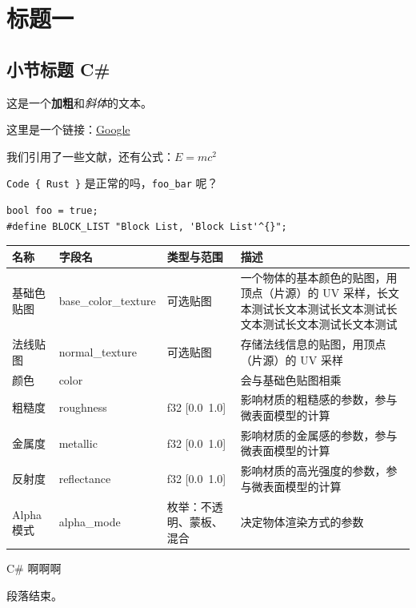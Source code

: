 \chapter*{标题一}

\section{小节标题 C\#}

这是一个\textbf{加粗}和\textit{斜体}的文本。

这里是一个链接：\href{https://www.google.com}{Google}

我们引用了一些文献\cite{foo}，还有公式：$E = mc^2$

\texttt{Code \{ Rust \}} 是正常的吗，\texttt{foo\_bar} 呢？

\begin{lstlisting}
bool foo = true;
#define BLOCK_LIST "Block List, 'Block List'^{}";
\end{lstlisting}


\begin{tabularx}{\textwidth}{|>{\centering\arraybackslash}X|>{\centering\arraybackslash}X|>{\centering\arraybackslash}X|>{\centering\arraybackslash}X|} \hline
名称 & 字段名 & 类型与范围 & 描述 \\ \hline
基础色贴图 & base\_color\_texture & 可选贴图 & 一个物体的基本颜色的贴图，用顶点（片源）的 UV 采样，长文本测试长文本测试长文本测试长文本测试长文本测试长文本测试 \\ \hline
法线贴图 & normal\_texture & 可选贴图 & 存储法线信息的贴图，用顶点（片源）的 UV 采样 \\ \hline
颜色 & color & [f32; 4] & 会与基础色贴图相乘 \\ \hline
粗糙度 & roughness & f32 [0.0~1.0] & 影响材质的粗糙感的参数，参与微表面模型的计算 \\ \hline
金属度 & metallic & f32 [0.0~1.0] & 影响材质的金属感的参数，参与微表面模型的计算 \\ \hline
反射度 & reflectance & f32 [0.0~1.0] & 影响材质的高光强度的参数，参与微表面模型的计算 \\ \hline
Alpha 模式 & alpha\_mode & 枚举：不透明、蒙板、混合 & 决定物体渲染方式的参数 \\ \hline
\end{tabularx}

C\# 啊啊啊

段落结束。

